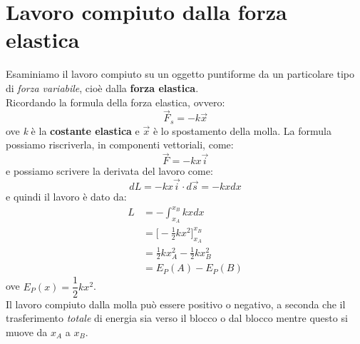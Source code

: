 \documentclass[12pt]{report}
\begin{document}
	\section{Lavoro compiuto dalla forza elastica}
	Esaminiamo il lavoro compiuto su un oggetto puntiforme da un particolare tipo di \textit{forza variabile}, cioè dalla \textbf{forza elastica}. \\
	Ricordando la formula della forza elastica, ovvero:
	\[
	\vec{F}_s = -k\vec{x}
	\]
	ove \textit{k} è la \textbf{costante elastica} e $\vec{x}$ è lo spostamento della molla. La formula possiamo riscriverla, in componenti vettoriali, come:
	\[
	\vec{F} = -kx\vec{i}
	\]
	e possiamo scrivere la derivata del lavoro come:
	\[
	dL = -kx\vec{i} \cdot d\vec{s} = -kxdx
	\]
	e quindi il lavoro è dato da:
	\begin{align*}
		L &= -\int_{x_A}^{x_B}kxdx \\
		&= \Bigg[-\frac{1}{2}kx^2\Bigg]_{x_A}^{x_B} \\
		&= \frac{1}{2}kx_A^2 - \frac{1}{2}kx_B^2 \\
		&= E_P(A) - E_P(B)
	\end{align*}
	ove $E_P(x) = \dfrac{1}{2}kx^2$. \\
	Il lavoro compiuto dalla molla può essere positivo o negativo, a seconda che il trasferimento \textit{totale} di energia sia verso il blocco o dal blocco mentre questo si muove da $x_A$ a $x_B$.
\end{document}
